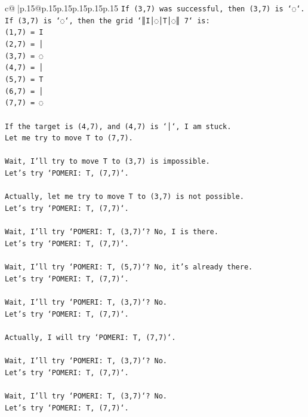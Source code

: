 \documentclass{article}
\begin{document}
{\begin{supertabular}{c@{$\;$}|p{.15\linewidth}@{}p{.15\linewidth}p{.15\linewidth}p{.15\linewidth}p{.15\linewidth}p{.15\linewidth}}
{{{\texttt{If (3,7) was successful, then (3,7) is `◌`.} \\
\texttt{If (3,7) is `◌`, then the grid `║I│◌│T│◌║ 7` is:} \\
\texttt{(1,7) = I} \\
\texttt{(2,7) = │} \\
\texttt{(3,7) = ◌} \\
\texttt{(4,7) = │} \\
\texttt{(5,7) = T} \\
\texttt{(6,7) = │} \\
\texttt{(7,7) = ◌} \\
\\ 
\texttt{If the target is (4,7), and (4,7) is `│`, I am stuck.} \\
\texttt{Let me try to move T to (7,7).} \\
\\ 
\texttt{Wait, I'll try to move T to (3,7) is impossible.} \\
\texttt{Let's try `POMERI: T, (7,7)`.} \\
\\ 
\texttt{Actually, let me try to move T to (3,7) is not possible.} \\
\texttt{Let's try `POMERI: T, (7,7)`.} \\
\\ 
\texttt{Wait, I'll try `POMERI: T, (3,7)`? No, I is there.} \\
\texttt{Let's try `POMERI: T, (7,7)`.} \\
\\ 
\texttt{Wait, I'll try `POMERI: T, (5,7)`? No, it's already there.} \\
\texttt{Let's try `POMERI: T, (7,7)`.} \\
\\ 
\texttt{Wait, I'll try `POMERI: T, (3,7)`? No.} \\
\texttt{Let's try `POMERI: T, (7,7)`.} \\
\\ 
\texttt{Actually, I will try `POMERI: T, (7,7)`.} \\
\\ 
\texttt{Wait, I'll try `POMERI: T, (3,7)`? No.} \\
\texttt{Let's try `POMERI: T, (7,7)`.} \\
\\ 
\texttt{Wait, I'll try `POMERI: T, (3,7)`? No.} \\
\texttt{Let's try `POMERI: T, (7,7)`.} \\
\\ 
}}}
\end{supertabular}}
\end{document}

